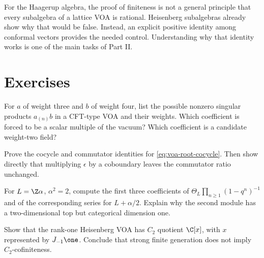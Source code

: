 For the Haagerup algebra, the proof of finiteness is not a general
principle that every subalgebra of a lattice VOA is rational.
Heisenberg subalgebras already show why that would be false.
Instead, an explicit positive identity among conformal vectors
provides the needed control. Understanding why that identity works
is one of the main tasks of Part II.

\section{Exercises}

\begin{exercise}\label{ex:voa-weight}
For $a$ of weight three and $b$ of weight four, list the possible
nonzero singular products $a_{(n)}b$ in a CFT-type VOA and their
weights. Which coefficient is forced to be a scalar multiple of
the vacuum? Which coefficient is a candidate weight-two field?

\par\smallskip{}\par
\end{exercise}

\begin{exercise}\label{ex:voa-cocycle}
Prove the cocycle and commutator identities for
\eqref{eq:voa-root-cocycle}. Then show directly that multiplying
$\epsilon$ by a coboundary leaves the commutator ratio unchanged.

\par\smallskip{}\par
\end{exercise}

\begin{exercise}\label{ex:voa-rankone}
For $L=\Z\alpha$, $\alpha^2=2$, compute the first three coefficients
of $\Theta_L\prod_{n\ge1}(1-q^n)^{-1}$ and of the corresponding
series for $L+\alpha/2$. Explain why the second module has a
two-dimensional top but categorical dimension one.

\par\smallskip{}\par
\end{exercise}

\begin{exercise}\label{ex:voa-heisenberg-c2}
Show that the rank-one Heisenberg VOA has $C_2$ quotient
$\C[x]$, with $x$ represented by $J_{-1}\one$. Conclude that
strong finite generation does not imply $C_2$-cofiniteness.

\par\smallskip{}\par
\end{exercise}

